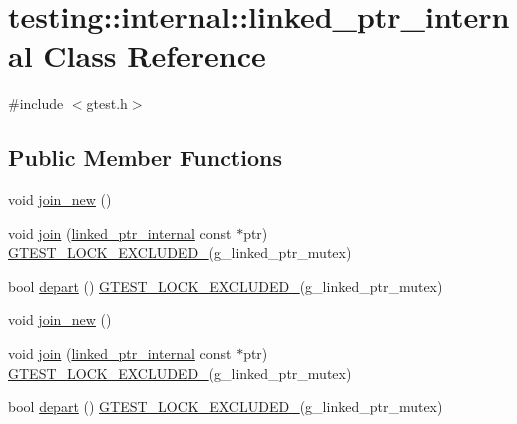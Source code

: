 \hypertarget{classtesting_1_1internal_1_1linked__ptr__internal}{\section{testing\-:\-:internal\-:\-:linked\-\_\-ptr\-\_\-internal Class Reference}
\label{classtesting_1_1internal_1_1linked__ptr__internal}
}


{\ttfamily \#include $<$gtest.\-h$>$}

\subsection*{Public Member Functions}
\begin{DoxyCompactItemize}
\item 
void \hyperlink{classtesting_1_1internal_1_1linked__ptr__internal_a742af1f65df2d5e2b7198a1b74264a83}{join\-\_\-new} ()
\item 
void \hyperlink{classtesting_1_1internal_1_1linked__ptr__internal_acd5a341459f7e81b10b4112d8c764e2a}{join} (\hyperlink{classtesting_1_1internal_1_1linked__ptr__internal}{linked\-\_\-ptr\-\_\-internal} const $\ast$ptr) \hyperlink{gtest-port_8h_a69abff5a4efdd07bd5faebe3dd318d06}{G\-T\-E\-S\-T\-\_\-\-L\-O\-C\-K\-\_\-\-E\-X\-C\-L\-U\-D\-E\-D\-\_\-}(g\-\_\-linked\-\_\-ptr\-\_\-mutex)
\item 
bool \hyperlink{classtesting_1_1internal_1_1linked__ptr__internal_a8699e539d9702d363ef0351012d1b3ca}{depart} () \hyperlink{gtest-port_8h_a69abff5a4efdd07bd5faebe3dd318d06}{G\-T\-E\-S\-T\-\_\-\-L\-O\-C\-K\-\_\-\-E\-X\-C\-L\-U\-D\-E\-D\-\_\-}(g\-\_\-linked\-\_\-ptr\-\_\-mutex)
\item 
void \hyperlink{classtesting_1_1internal_1_1linked__ptr__internal_a742af1f65df2d5e2b7198a1b74264a83}{join\-\_\-new} ()
\item 
void \hyperlink{classtesting_1_1internal_1_1linked__ptr__internal_acd5a341459f7e81b10b4112d8c764e2a}{join} (\hyperlink{classtesting_1_1internal_1_1linked__ptr__internal}{linked\-\_\-ptr\-\_\-internal} const $\ast$ptr) \hyperlink{gtest-port_8h_a69abff5a4efdd07bd5faebe3dd318d06}{G\-T\-E\-S\-T\-\_\-\-L\-O\-C\-K\-\_\-\-E\-X\-C\-L\-U\-D\-E\-D\-\_\-}(g\-\_\-linked\-\_\-ptr\-\_\-mutex)
\item 
bool \hyperlink{classtesting_1_1internal_1_1linked__ptr__internal_a8699e539d9702d363ef0351012d1b3ca}{depart} () \hyperlink{gtest-port_8h_a69abff5a4efdd07bd5faebe3dd318d06}{G\-T\-E\-S\-T\-\_\-\-L\-O\-C\-K\-\_\-\-E\-X\-C\-L\-U\-D\-E\-D\-\_\-}(g\-\_\-linked\-\_\-ptr\-\_\-mutex)
\end{DoxyCompactItemize}



